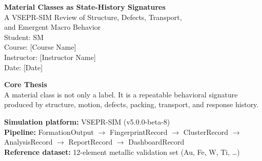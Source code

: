 \documentclass[12pt]{article}
\newcommand{\vsim}{\textsc{VSEPR-SIM}}
\begin{document}
\begin{titlepage}
	\centering
	\vspace*{1.2in}

	{\Huge \textbf{Material Classes as State-History Signatures}}\\[0.3in]
	{\Large A \vsim{} Review of Structure, Defects, Transport,\\[0.1in]
	 and Emergent Macro Behavior}\\[0.75in]

	{\large Student: SM}\\[0.15in]
	{\large Course: [Course Name]}\\[0.1in]
	{\large Instructor: [Instructor Name]}\\[0.1in]
	{\large Date: [Date]}\\[1in]

	\vfill

	\begin{mdframed}[backgroundcolor=gray!8,linecolor=gray!50,linewidth=1pt,
					 innertopmargin=10pt,innerbottommargin=10pt,
					 innerleftmargin=14pt,innerrightmargin=14pt]
	\centering
	\textbf{Core Thesis}\\[0.1in]
	A material class is not only a label.
	It is a repeatable behavioral signature produced by structure,
	motion, defects, packing, transport, and response history.
	\end{mdframed}

	\vfill

	\noindent\textbf{Simulation platform:} \vsim{} (v5.0.0-beta-8)\\
	\textbf{Pipeline:} FormationOutput $\to$ FingerprintRecord $\to$ ClusterRecord
	$\to$ AnalysisRecord $\to$ ReportRecord $\to$ DashboardRecord\\
	\textbf{Reference dataset:} 12-element metallic validation set (Au, Fe, W, Ti, \ldots)

	\vfill
\end{titlepage}

\tableofcontents
\newpage
\listoffigures
\listoftables
\newpage
\end{document}
